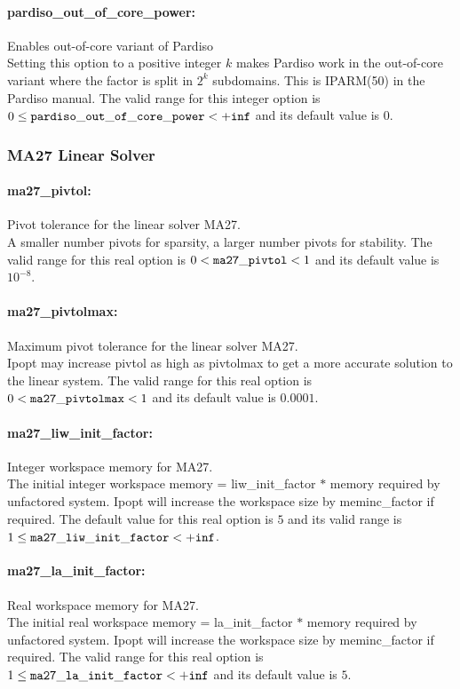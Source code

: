 \paragraph{pardiso\_out\_of\_core\_power:} Enables out-of-core variant of Pardiso $\;$ \\
Setting this option to a positive integer $k$ makes Pardiso work in the out-of-core variant where the factor is split in $2^k$ subdomains.
This is IPARM(50) in the Pardiso manual.
The valid range for this integer option is $0 \le {\tt pardiso\_out\_of\_core\_power } <  {\tt +inf}$ and its default value is $0$.

\subsubsection{MA27 Linear Solver}

\paragraph{ma27\_pivtol:} Pivot tolerance for the linear solver MA27. $\;$ \\
A smaller number pivots for sparsity, a larger number pivots for stability.
The valid range for this real option is $0 <  {\tt ma27\_pivtol } <  1$ and its default value is $10^{-8}$.


\paragraph{ma27\_pivtolmax:} Maximum pivot tolerance for the linear solver MA27. $\;$ \\
Ipopt may increase pivtol as high as pivtolmax to get a more accurate solution to the linear
system.
The valid range for this real option is $0 <  {\tt ma27\_pivtolmax } <  1$ and its default value is $0.0001$.


\paragraph{ma27\_liw\_init\_factor:} Integer workspace memory for MA27. $\;$ \\
The initial integer workspace memory = liw\_init\_factor $*$ memory required by unfactored system.
Ipopt will increase the workspace size by meminc\_factor if required.
The default value for this real option is $5$ and its valid range is $1 \le {\tt ma27\_liw\_init\_factor } <  {\tt +inf}$.


\paragraph{ma27\_la\_init\_factor:} Real workspace memory for MA27. $\;$ \\
The initial real workspace memory = la\_init\_factor $*$ memory required by unfactored system. 
Ipopt will increase the workspace size by meminc\_factor if required.
The valid range for this real option is $1 \le {\tt ma27\_la\_init\_factor } <  {\tt +inf}$ and its default value is $5$.



